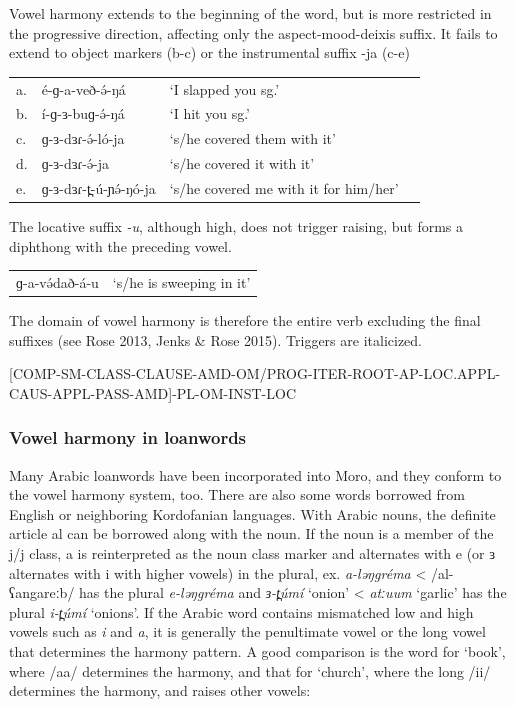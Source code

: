 Vowel harmony extends to the beginning of the word, but is more restricted in the progressive direction, affecting only the aspect-mood-deixis suffix. It fails to extend to object markers (b-c) or the instrumental suffix -ja (c-e)

\ea
\begin{tabular}[t]{llll}
a.&	é-ɡ-a-veð-ə́-ŋá		&	‘I slapped you sg.’	 \\
b.&	í-ɡ-ɜ-buɡ-ə́-ŋá		&	‘I hit you sg.’		 \\
c.&	ɡ-ɜ-dɜɾ-ə́-ló-ja		&	‘s/he covered them with it’\\
d.&	ɡ-ɜ-dɜɾ-ə́-ja			&	‘s/he covered it with it’\\
e.&	ɡ-ɜ-dɜɾ-t̪-ú-ɲə́-ŋó-ja	&	‘s/he covered me with it for him/her’\\
\end{tabular}
\z

The locative suffix \textit{-u}, although high, does not trigger raising, but forms a diphthong with the preceding vowel.

\ea
\begin{tabular}[t]{ll}
ɡ-a-və́dað-á-u	&	‘s/he is sweeping in it’\\
\end{tabular}
\z

The domain of vowel harmony is therefore the entire verb excluding the final suffixes (see Rose 2013, Jenks \& Rose 2015). Triggers are italicized. 

\textsc{[COMP-SM-CLASS-CLAUSE-AMD-OM/PROG-ITER-ROOT-AP-LOC.APPL-CAUS-APPL-PASS-AMD]-PL-OM-INST-LOC}

\subsubsection{Vowel harmony in loanwords}
Many Arabic loanwords have been incorporated into Moro, and they conform to the vowel harmony system, too. There are also some words borrowed from English or neighboring Kordofanian languages. With Arabic nouns, the definite article al can be borrowed along with the noun. If the noun is a member of the j/j class, a is reinterpreted as the noun class marker and alternates with e (or ɜ alternates with i with higher vowels) in the plural, ex. \textit{a-ləŋgréma} < /al-ʕangareːb/ has the plural \textit{e-ləŋgréma} and \textit{ɜ-t̪úmí} ‘onion’ < \textit{atːuum} ‘garlic’ has the plural \textit{i-t̪úmí} ‘onions’. If the Arabic word contains mismatched low and high vowels such as \textit{i} and \textit{a}, it is generally the penultimate vowel or the long vowel that determines the harmony pattern. A good comparison is the word for ‘book’, where /aa/ determines the harmony, and that for ‘church’, where the long /ii/ determines the harmony, and raises other vowels:

